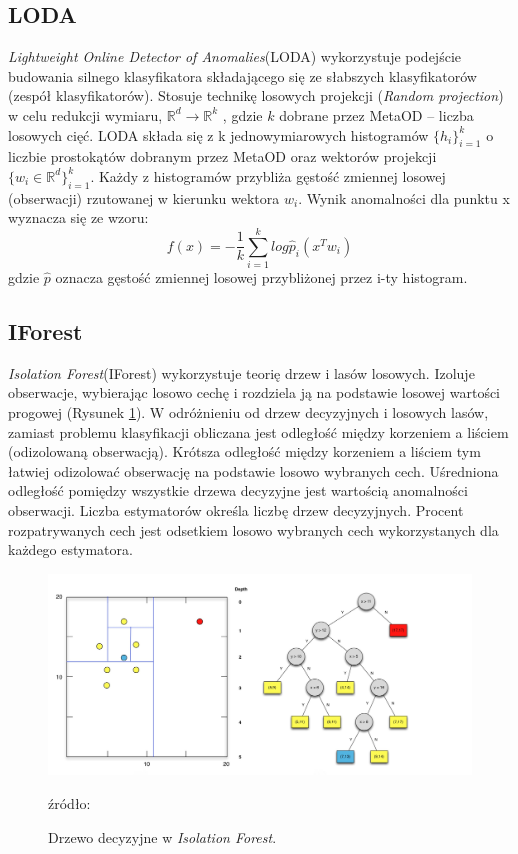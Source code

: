 \subsection{LODA}
\label{loda}
\textit{Lightweight Online Detector of Anomalies}(LODA) \cite{loda}
wykorzystuje podejście budowania silnego klasyfikatora składającego się ze słabszych klasyfikatorów (zespół klasyfikatorów). Stosuje technikę losowych projekcji (\textit{Random projection}) w celu redukcji wymiaru, $\mathbb{R}^d \rightarrow \mathbb{R}^k$  \cite{raf2017}, gdzie $k$ dobrane przez MetaOD -- liczba losowych cięć.
LODA składa się z k jednowymiarowych histogramów $\{h_i\}^k_{i=1}$ o liczbie prostokątów dobranym przez MetaOD oraz wektorów projekcji $\{w_i \in \mathbb{R}^d \}^k_{i=1}$. Każdy z histogramów przybliża gęstość zmiennej losowej (obserwacji) rzutowanej w kierunku wektora $w_i$. 
Wynik anomalności dla punktu x wyznacza się ze wzoru:
\begin{equation}
    f(x) = -\frac{1}{k}\sum\limits^k_{i=1}log\hat{p}_i(x^Tw_i)
\end{equation}
gdzie $\hat{p}$ oznacza gęstość zmiennej losowej przybliżonej przez i-ty histogram.
\subsection{IForest}
\label{iforest}
\label{sub:IF}
\textit{Isolation Forest}(IForest) \cite{iforest} wykorzystuje teorię drzew i lasów losowych. Izoluje obserwacje, wybierając losowo cechę i rozdziela ją na podstawie losowej wartości progowej (Rysunek \ref{fig:iforest}). W odróżnieniu od drzew decyzyjnych i losowych lasów, zamiast problemu klasyfikacji obliczana jest odległość między korzeniem a liściem (odizolowaną obserwacją). Krótsza odległość między korzeniem a liściem tym łatwiej odizolować obserwację na podstawie losowo wybranych cech. Uśredniona odległość pomiędzy wszystkie drzewa decyzyjne jest wartością anomalności obserwacji. Liczba estymatorów określa liczbę drzew decyzyjnych. Procent rozpatrywanych cech jest odsetkiem losowo wybranych cech wykorzystanych dla każdego estymatora.

\begin{figure}[h]
    \centering
    \includegraphics[width=\textwidth]{chapters/MetaOD/images/iforest.jpg}
    \caption{Drzewo decyzyjne w \textit{Isolation Forest}.}
    \footnotesize{źródło: \cite{if-image}}
    \label{fig:iforest}
\end{figure}

